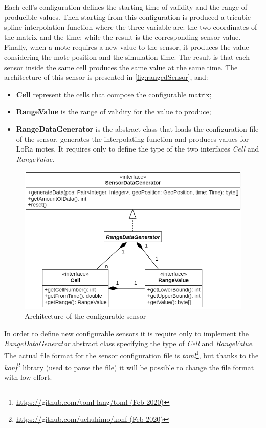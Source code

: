 Each cell's configuration defines the starting time of validity and the range of producible values. 
Then starting from this configuration is produced a tricubic spline interpolation function where the three variable are: the two coordinates of the matrix and the time; while the result is the corresponding sensor value.
Finally, when a mote requires a new value to the sensor, it produces the value considering the mote position and the simulation time.
The result is that each sensor inside the same cell produces the same value at the same time. 
The architecture of this sensor is presented in \autoref{fig:rangedSensor}, and:
\begin{itemize}
    \item \textbf{Cell} represent the cells that compose the configurable matrix;
    \item \textbf{RangeValue} is the range of validity for the value to produce;
    \item \textbf{RangeDataGenerator} is the abstract class that loads the configuration file of the sensor, generates the interpolating function and produces values for LoRa motes. It requires only to define the type of the two interfaces \textit{Cell} and \textit{RangeValue}.
\end{itemize}
% 
\begin{figure}[h]
    \centering
    \includegraphics[scale=0.7]{figures/rangedSensor.png}
    \caption{Architecture of the configurable sensor}
    \label{fig:rangedSensor}
\end{figure}
% 
In order to define new configurable sensors it is require only to implement the \mbox{\textit{RangeDataGenerator}} abstract class specifying the type of \mbox{\textit{Cell}} and \mbox{\textit{RangeValue}}.
The actual file format for the sensor configuration file is \textit{toml}\footnote{\href{https://github.com/toml-lang/toml}{https://github.com/toml-lang/toml (Feb 2020)}}, but thanks to the \textit{konf}\footnote{\href{https://github.com/uchuhimo/konf}{https://github.com/uchuhimo/konf (Feb 2020)}} library (used to parse the file) it will be possible to change the file format with low effort.

